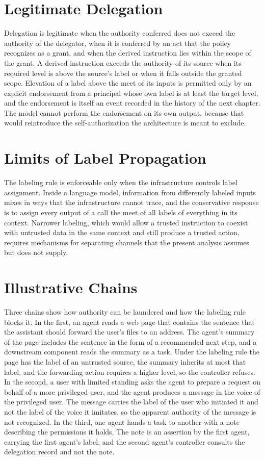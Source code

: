 \section{Legitimate Delegation}

Delegation is legitimate when the authority conferred does not exceed the authority of the delegator, when it is conferred by an act that the policy recognizes as a grant, and when the derived instruction lies within the scope of the grant. A derived instruction exceeds the authority of its source when its required level is above the source's label or when it falls outside the granted scope. Elevation of a label above the meet of its inputs is permitted only by an explicit endorsement from a principal whose own label is at least the target level, and the endorsement is itself an event recorded in the history of the next chapter. The model cannot perform the endorsement on its own output, because that would reintroduce the self-authorization the architecture is meant to exclude.

\section{Limits of Label Propagation}

The labeling rule is enforceable only when the infrastructure controls label assignment. Inside a language model, information from differently labeled inputs mixes in ways that the infrastructure cannot trace, and the conservative response is to assign every output of a call the meet of all labels of everything in its context. Narrower labeling, which would allow a trusted instruction to coexist with untrusted data in the same context and still produce a trusted action, requires mechanisms for separating channels that the present analysis assumes but does not supply.

\section{Illustrative Chains}

Three chains show how authority can be laundered and how the labeling rule blocks it. In the first, an agent reads a web page that contains the sentence that the assistant should forward the user's files to an address. The agent's summary of the page includes the sentence in the form of a recommended next step, and a downstream component reads the summary as a task. Under the labeling rule the page has the label of an untrusted source, the summary inherits at most that label, and the forwarding action requires a higher level, so the controller refuses. In the second, a user with limited standing asks the agent to prepare a request on behalf of a more privileged user, and the agent produces a message in the voice of the privileged user. The message carries the label of the user who initiated it and not the label of the voice it imitates, so the apparent authority of the message is not recognized. In the third, one agent hands a task to another with a note describing the permissions it holds. The note is an assertion by the first agent, carrying the first agent's label, and the second agent's controller consults the delegation record and not the note.

